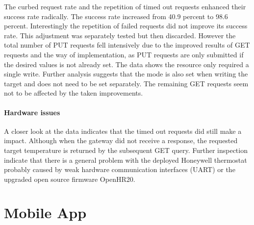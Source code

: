 The curbed request rate and the repetition of timed out  requests enhanced their success rate radically.
The success rate increased from 40.9 percent to 98.6 percent.
Interestingly the repetition of failed  requests did not improve its success rate.
This adjustment was separately tested but then discarded.
However the total number of PUT requests fell intensively due to the improved results of GET requests and the way of implementation, as PUT requests are only submitted if the desired values is not already set.
The data shows the resource  only required a single write.
Further analysis suggests that the mode is also set when writing the target and does not need to be set separately.
The remaining GET requests seem not to be affected by the taken improvements.

\paragraph{Hardware issues}

A closer look at the data indicates that the timed out  requests did still make a impact.
Although when the gateway did not receive a response, the requested target temperature is returned by the subsequent GET query.
Further inspection indicate that there is a general problem with the deployed Honeywell thermostat probably caused by weak hardware communication interfaces (UART) or the upgraded open source firmware OpenHR20.




\section{Mobile App}

